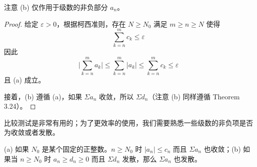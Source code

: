 \documentclass[../poma-notes.tex]{subfiles}
\begin{document}
注意 (b) 仅作用于级数的非负部分 $a_n$。

\begin{proof}
  给定 $\varepsilon > 0$，根据柯西准则，存在 $N \ge N_0$ 满足 $m \ge n \ge N$ 使得
  \[ \sum_{k=n}^{m} c_k \le \varepsilon \]
  因此
  \[ \Bigg| \sum_{k=n}^{m} a_k \Bigg| \le \sum_{k=n}^{m} |a_k| \le \sum_{k=n}^{m} c_k \le \varepsilon \]
  且 (a) 成立。

  接着，(b) 遵循 (a)，如果 $\Sigma a_n$ 收敛，所以 $\Sigma d_n$（注意 (b) 同样遵循 Theorem 3.24）。
\end{proof}

比较测试是非常有用的；为了更效率的使用，我们需要熟悉一些级数的非负项是否为收敛或者发散。

\anote (a) 如果 $N_0$ 是某个固定的正整数。$n \ge N_0$ 时 $|a_n| \le c_n$ 而且 $\Sigma a_n$ 也收敛；(b) 如果当 $n \ge N_0$ 时
$a_n \ge d_n \ge 0$ 而且 $\Sigma d_n$ 发散，那么 $\Sigma a_n$ 也发散。

\end{document}

